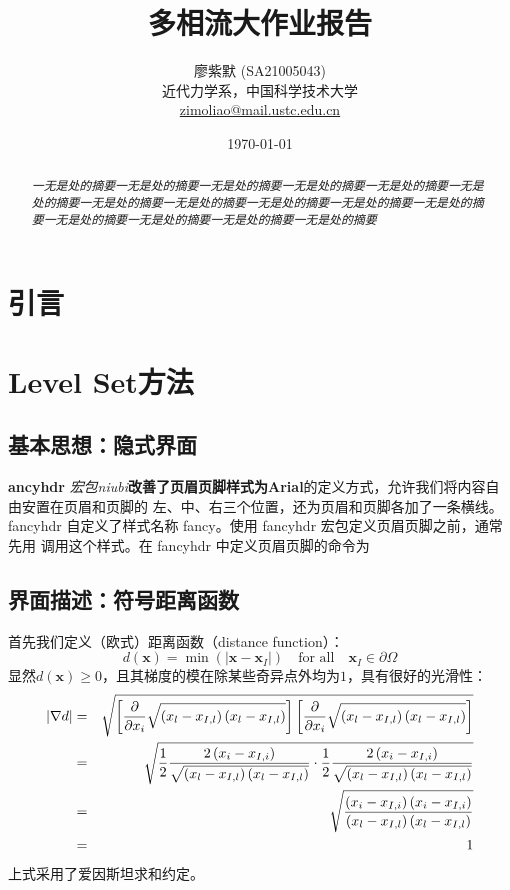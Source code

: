 \documentclass[10pt]{article}
\title{\LARGE\textbf{多相流大作业报告}}
\author{廖紫默 (SA21005043)\\
\small 近代力学系，中国科学技术大学\\
\small \href{mailto:zimoliao@mail.ustc.edu.cn}{zimoliao@mail.ustc.edu.cn}}
\date{\today}
\begin{document}
\maketitle
\thispagestyle{assignment-title}
\begin{abstract}
    \normalsize\it 一无是处的摘要一无是处的摘要一无是处的摘要一无是处的摘要一无是处的摘要一无是处的摘要一无是处的摘要一无是处的摘要一无是处的摘要一无是处的摘要一无是处的摘要一无是处的摘要一无是处的摘要一无是处的摘要一无是处的摘要
\end{abstract}

\tableofcontents


\newpage
{}
\setcounter{page}{1}
\section{引言}


\newpage
\section{Level Set方法}
\subsection{基本思想：隐式界面}
\textbf{ancyhdr} \textit{宏包niubi}\textbf{改善了页眉页脚样式为Arial}的定义方式，允许我们将内容自由安置在页眉和页脚的
左、中、右三个位置，还为页眉和页脚各加了一条横线。
fancyhdr 自定义了样式名称 fancy。使用 fancyhdr 宏包定义页眉页脚之前，通常先用  调用这个样式。在 fancyhdr 中定义页眉页脚的命令为

\subsection{界面描述：符号距离函数}
首先我们定义（欧式）距离函数（distance function）：
\begin{equation}
    d(\bm{x})=\min\left(\left|\bm{x}-\bm{x}_I\right|\right)\quad\text{for all}\quad \bm{x}_I\in\partial\Omega
\end{equation}
显然$d(\bm{x})\geq0$，且其梯度的模在除某些奇异点外均为$1$，具有很好的光滑性：
\begin{eqnarray}
    \left|\nabla d\right| &=& \sqrt{\left[\frac{\partial}{\partial x_i}\sqrt{\left(x_l-x_{I,l}\right)\left(x_l-x_{I,l}\right)}\right]\left[\frac{\partial}{\partial x_i}\sqrt{\left(x_l-x_{I,l}\right)\left(x_l-x_{I,l}\right)}\right]}\notag\\
    &=&\sqrt{\frac{1}{2}\frac{2\left(x_i-x_{I,i}\right)}{\sqrt{\left(x_l-x_{I,l}\right)\left(x_l-x_{I,l}\right)}}\cdot\frac{1}{2}\frac{2\left(x_i-x_{I,i}\right)}{\sqrt{\left(x_l-x_{I,l}\right)\left(x_l-x_{I,l}\right)}}}\notag\\
    &=&\sqrt{\frac{\left(x_i-x_{I,i}\right)\left(x_i-x_{I,i}\right)}{\left(x_l-x_{I,l}\right)\left(x_l-x_{I,l}\right)}}\notag\\
    &=&1
\end{eqnarray}
上式采用了爱因斯坦求和约定。
\end{document}
